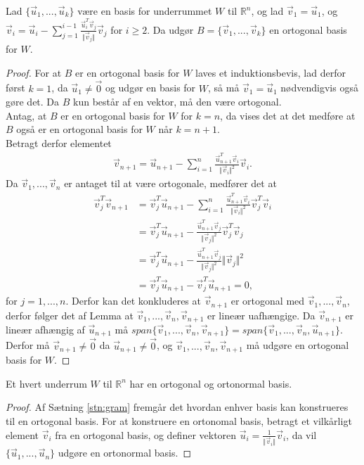 \begin{stn}
Lad $\{\vec{u}_1, ..., \vec{u}_k\}$ være en basis for underrummet $W$ til $\mathds{R}^n$, og lad 
$\vec{v}_1 = \vec{u}_1$, og $\vec{v}_i= \vec{u}_i - \sum_{j=1}^{i-1} \frac{\vec{u}_i^T \vec{v}_j}{\Vert\vec{v}_j\Vert}\vec{v}_j$ for $i \geq 2$.
Da udgør $B = \{\vec{v}_1,..., \vec{v}_k\}$ en ortogonal basis for $W$.
\label{stn:gram}
\end{stn}
\begin{proof}
For at $B$ er en ortogonal basis for $W$ laves et induktionsbevis, lad derfor først $k= 1$, da $\vec{u}_1\neq \vec{0}$ og udgør en basis for $W$, så må $\vec{v}_1 = \vec{u}_1$ nødvendigvis også gøre det.
Da $B$ kun består af en vektor, må den være ortogonal.
\\Antag, at $B$ er en ortogonal basis for $W$ for $k=n$, da vises det at det medføre at $B$ også er en ortogonal basis for  $W$ når $k = n+1$.
\\Betragt derfor elementet 
\begin{align*}
\vec{v}_{n+1} = \vec{u}_{n+1} - \sum_{i=1}^n \frac{\vec{u}_{n+1}^T\vec{v}_i}{\Vert\vec{v}_i\Vert^2}\vec{v}_i.
\end{align*}
Da $\vec{v}_1,...,\vec{v}_n$ er antaget til at være ortogonale, medfører det at
\begin{align*}
\vec{v}_j^T\vec{v}_{n+1} &= \vec{v}_j^T\vec{u}_{n+1} - \sum_{i=1}^n \frac{\vec{u}_{n+1}^T\vec{v}_i}{\Vert\vec{v}_i\Vert^2}\vec{v}_j^T\vec{v}_i
\\ &= \vec{v}_j^T\vec{u}_{n+1} - \frac{\vec{u}_{n+1}^T\vec{v}_j}{\Vert\vec{v}_j\Vert^2}\vec{v}_j^T\vec{v}_j
\\ & = \vec{v}_j^T\vec{u}_{n+1} -  \frac{\vec{u}_{n+1}^T\vec{v}_j}{\Vert\vec{v}_j\Vert^2}\Vert\vec{v}_j\Vert^2
\\ & =\vec{v}_j^T\vec{u}_{n+1} - \vec{v}_j^T\vec{u}_{n+1} = 0 , 
\end{align*}
for $j = 1,...,n$. 
Derfor kan det konkluderes at $\vec{v}_{n+1}$ er ortogonal med $\vec{v}_1,...,\vec{v}_n$, derfor følger det af Lemma %
at $\vec{v}_1,...,\vec{v}_n, \vec{v}_{n+1}$ er lineær uafhængige.
Da $\vec{v}_{n+1}$ er lineær afhængig af $\vec{u}_{n+1}$ må $span\{\vec{v}_1,...,\vec{v}_n, \vec{v}_{n+1}\} = span\{\vec{v}_1,...,\vec{v}_n, \vec{u}_{n+1}\}$.
Derfor må $\vec{v}_{n+1} \neq \vec{0}$ da $\vec{u}_{n+1} \neq \vec{0}$, og $\vec{v}_1,...,\vec{v}_n, \vec{v}_{n+1}$ må udgøre en ortogonal basis for $W$.
\end{proof}


\begin{kor}
Et hvert underrum $W$ til $\mathds{R}^n$ har en ortogonal og ortonormal basis.
\end{kor}
\begin{proof}
Af Sætning \ref{stn:gram} fremgår det hvordan enhver basis kan konstrueres til en ortogonal basis. 
For at konstruere en ortonomal basis, betragt et vilkårligt element $\vec{v}_i$ fra en ortogonal basis, og definer vektoren $\vec{u}_i = \frac{1}{\Vert\vec{v}_i\Vert}\vec{v}_i$, da vil $\{\vec{u}_1,...,\vec{u}_n\}$ udgøre en ortonormal basis. 
\end{proof}


